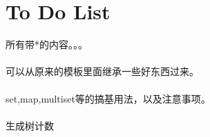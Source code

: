 \section{To Do List}
    所有带*的内容。。。\\
    \\
    可以从原来的模板里面继承一些好东西过来。\\
    \\
    set,map,multiset等的搞基用法，以及注意事项。\\
    \\
    生成树计数\\
